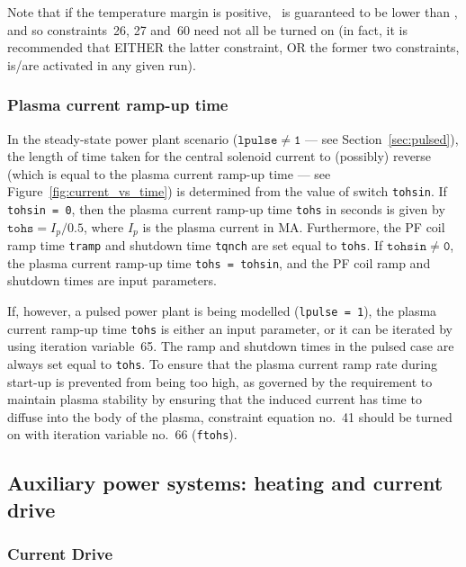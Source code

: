 \documentclass[11pt,a4paper]{report}
\begin{document}
Note that if the temperature margin is positive, \jop\ is guaranteed to be
lower than \jcrit, and so constraints~26, 27 and~60 need not all be turned on
(in fact, it is recommended that EITHER the latter constraint, OR the former
two constraints, is/are activated in any given run).

\subsubsection{Plasma current ramp-up time}
\label{sec:tohs}

In the steady-state power plant scenario ($\mathtt{lpulse \not= 1}$ --- see
Section~\ref{sec:pulsed}), the length of time taken for the central solenoid
current to (possibly) reverse (which is equal to the plasma current ramp-up time --- see
Figure~\ref{fig:current_vs_time}) is determined from the value of switch
\texttt{tohsin}. If \texttt{tohsin = 0}, then the plasma current ramp-up
time \texttt{tohs} in seconds is given by $\mathtt{tohs} = I_p / 0.5$, where
$I_p$ is the plasma current in MA\@. Furthermore, the PF coil ramp time
\texttt{tramp} and shutdown time \texttt{tqnch} are set equal to
\texttt{tohs}.  If $\mathtt{tohsin \not= 0}$, the plasma current ramp-up
time \texttt{tohs = tohsin}, and the PF coil ramp and shutdown times are input
parameters.

If, however, a pulsed power plant is being modelled (\texttt{lpulse = 1}), the
plasma current ramp-up time \texttt{tohs} is either an input parameter, or it can be
iterated by using iteration variable~65. The ramp and shutdown times in the
pulsed case are always set equal to \texttt{tohs}. To ensure that the plasma
current ramp rate during start-up is prevented from being too high, as
governed by the requirement to maintain plasma stability by ensuring that the induced current has time to diffuse into the body of the plasma, constraint equation no.\ 41 should be turned on with iteration variable no.\ 66 (\texttt{ftohs}).

\subsection{Auxiliary power systems: heating and current drive}
\label{sec:hcd}

\subsubsection{Current Drive}
\end{document}
